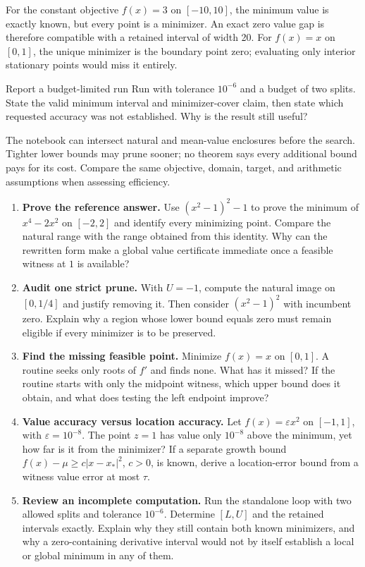 For the constant objective $f(x)=3$ on $[-10,10]$, the minimum value is
exactly known, but every point is a minimizer. An exact zero value gap is
therefore compatible with a retained interval of width 20. For $f(x)=x$
on $[0,1]$, the unique minimizer is the boundary point zero; evaluating only
interior stationary points would miss it entirely.

\begin{question}{Report a budget-limited run}
Run with tolerance $10^{-6}$ and a budget of two splits. State the valid
minimum interval and minimizer-cover claim, then state which requested
accuracy was not established. Why is the result still useful?
\end{question}

The notebook can intersect natural and mean-value enclosures before the
search. Tighter lower bounds may prune sooner; no theorem says every
additional bound pays for its cost. Compare the same objective, domain,
target, and arithmetic assumptions when assessing efficiency.

\newpage
{}
\begin{enumerate}
\item \textbf{Prove the reference answer.} Use $(x^2-1)^2-1$ to prove
the minimum of $x^4-2x^2$ on $[-2,2]$ and identify every minimizing point.
Compare the natural range with the range obtained from this identity.
Why can the rewritten form make a global value certificate immediate once
a feasible witness at $1$ is available?

\item \textbf{Audit one strict prune.} With $U=-1$, compute the natural
image on $[0,1/4]$ and justify removing it. Then consider $(x^2-1)^2$
with incumbent zero. Explain why a region whose lower bound equals zero
must remain eligible if every minimizer is to be preserved.

\item \textbf{Find the missing feasible point.} Minimize $f(x)=x$ on
$[0,1]$. A routine seeks only roots of $f'$ and finds none. What has it
missed? If the routine starts with only the midpoint witness, which upper
bound does it obtain, and what does testing the left endpoint improve?

\item \textbf{Value accuracy versus location accuracy.} Let
$f(x)=\varepsilon x^2$ on $[-1,1]$, with $\varepsilon=10^{-8}$.
The point $z=1$ has value only $10^{-8}$ above the minimum, yet how far
is it from the minimizer? If a separate growth bound
$f(x)-\mu\ge c|x-x_*|^2$, $c>0$, is known, derive a location-error bound
from a witness value error at most $\tau$.

\item \textbf{Review an incomplete computation.} Run the standalone
loop with two allowed splits and tolerance $10^{-6}$. Determine $[L,U]$
and the retained intervals exactly. Explain why they still contain both
known minimizers, and why a zero-containing derivative interval would not
by itself establish a local or global minimum in any of them.
\end{enumerate}

